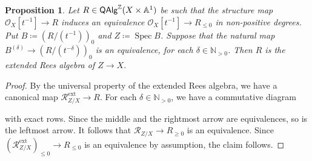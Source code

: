 \documentclass[a4paper,twoside,11pt]{amsart}
\theoremstyle{plain}
\newtheorem{proposition}[theorem]{Proposition}
\theoremstyle{definition}
\theoremstyle{remark}
\numberwithin{equation}{section}
\newcommand{\NN}{\mathbb{N}} %
\newcommand{\ZZ}{\mathbb{Z}} %
\newcommand{\QAlg}{\mathsf{QAlg}}
\DeclareMathOperator{\Spec}{Spec} %
\newcommand{\extd}{\mathrm{ext}} %
\newcommand{\oO}{\mathcal{O}}
\newcommand{\rR}{\mathcal{R}}
\begin{document}
\begin{proposition}
\label{Prop:Rees_image}
    Let $R \in \QAlg^\ZZ(X \times \AA^1)$ be such that the structure map $\oO_X[t^{-1}] \to R$ induces an equivalence $\oO_X[t^{-1}] \to R_{\leq 0}$ in non-positive degrees. Put $B \coloneqq (R/(t^{-1}))_0$ and $Z \coloneqq \Spec B$. Suppose that the natural map $B^{(\delta)} \to (R/(t^{-\delta}))_0$ is an equivalence, for each $\delta \in \NN_{>0}$. Then $R$ is the extended Rees algebra of $Z \to X$.
\end{proposition}

\begin{proof}
    By the universal property of the extended Rees algebra, we have a canonical map $\rR^{\extd}_{Z/X} \to R$. For each $\delta \in \NN_{>0}$, we have a commutative diagram
    \begin{center}
    \end{center}
    with exact rows. Since the middle and the rightmost arrow are equivalences, so is the leftmost arrow. It follows that $\rR_{Z/X} \to R_{\geq 0}$ is an equivalence. Since $(\rR_{Z/X}^{\extd})_{\leq 0} \to R_{\leq 0}$ is an equivalence by assumption, the claim follows.
\end{proof}



	
\end{document}
